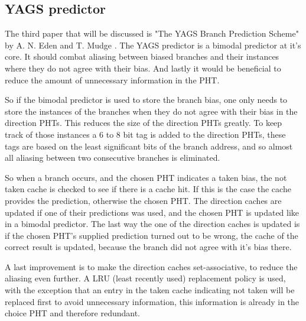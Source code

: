 \subsection{YAGS predictor}
\label{ssec:yags}
The third paper that will be discussed is "The YAGS Branch Prediction Scheme" by A. N. Eden and T. Mudge \cite{yags}.
The YAGS predictor is a bimodal predictor at it's core.
It should combat aliasing between biased branches and their instances where they do not agree with their bias.
And lastly it would be beneficial to reduce the amount of unnecessary information in the PHT.

So if the bimodal predictor is used to store the branch bias, one only needs to store the instances of the branches when they do not agree with their bias in the direction PHTs.
This reduces the size of the direction PHTs greatly.
To keep track of those instances a 6 to 8 bit tag is added to the direction PHTs, these tags are based on the least significant bits of the branch address, and so almost all aliasing between two consecutive branches is eliminated.

So when a branch occurs, and the chosen PHT indicates a taken bias, the not taken cache is checked to see if there is a cache hit.
If this is the case the cache provides the prediction, otherwise the chosen PHT.
The direction caches are updated if one of their predictions was used, and the chosen PHT is updated like in a bimodal predictor.
The last way the one of the direction caches is updated is if the chosen PHT's supplied prediction turned out to be wrong, the cache of the correct result is updated, because the branch did not agree with it's bias there.

A last improvement is to make the direction caches set-associative, to reduce the aliasing even further.
A LRU (least recently used) replacement policy is used, with the exception that an entry in the taken cache indicating not taken will be replaced first to avoid unnecessary information, this information is already in the choice PHT and therefore redundant.